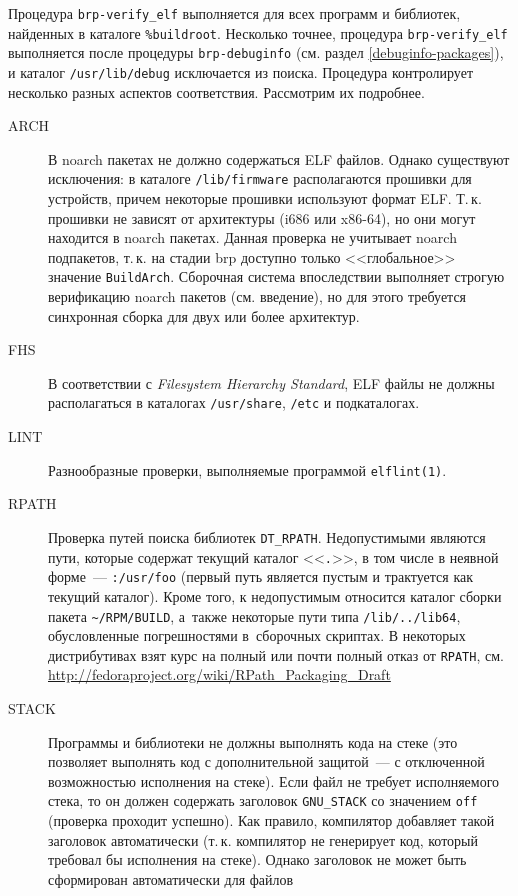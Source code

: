 \documentclass[russian,a4paper,12pt,titlepage]{article}
\begin{document}
Процедура \verb|brp-verify_elf| выполняется для всех программ и библиотек, найденных в каталоге \verb|%buildroot|.
Несколько точнее, процедура \verb|brp-verify_elf| выполняется после процедуры \verb|brp-debuginfo| (см. раздел
\ref{debuginfo-packages}), и каталог \verb|/usr/lib/debug| исключается из поиска.  Процедура контролирует несколько
разных аспектов соответствия.  Рассмотрим их подробнее.

\begin{description}
\item[ARCH] В noarch пакетах не должно содержаться ELF файлов.  Однако существуют исключения: в каталоге \verb|/lib/firmware|
располагаются прошивки для устройств, причем некоторые прошивки используют формат ELF.  Т.\,к. прошивки не зависят от архитектуры
(i686 или x86-64), но они могут находится в noarch пакетах.  Данная проверка не учитывает noarch подпакетов, т.\,к. на стадии
brp доступно только <<глобальное>> значение \verb|BuildArch|.  Сборочная система впоследствии выполняет строгую верификацию
noarch пакетов (см. введение), но для этого требуется синхронная сборка для двух или более архитектур.
\item[FHS] В соответствии с \textsl{Filesystem Hierarchy Standard}, ELF файлы не должны располагаться в каталогах \verb|/usr/share|,
\verb|/etc| и подкаталогах.
\item[LINT] Разнообразные проверки, выполняемые программой \verb|elflint(1)|.
\item[RPATH] Проверка путей поиска библиотек \verb|DT_RPATH|.  Недопустимыми являются пути, которые содержат текущий каталог <<\verb|.|>>,
в том числе в неявной форме~--- \verb|:/usr/foo| (первый путь является пустым и трактуется как текущий каталог).
Кроме того, к недопустимым относится каталог сборки пакета \verb|~/RPM/BUILD|, а~также некоторые пути типа \verb|/lib/../lib64|,
обусловленные погрешностями в~сборочных скриптах.  В некоторых дистрибутивах взят курс на полный или почти полный отказ от \verb|RPATH|,
см. \url{http://fedoraproject.org/wiki/RPath_Packaging_Draft}
\item[STACK] Программы и библиотеки не должны выполнять кода на стеке (это позволяет выполнять код с дополнительной защитой~---
с отключенной возможностью исполнения на стеке).  Если файл не требует исполняемого стека, то он должен содержать заголовок \verb|GNU_STACK|
со значением \verb|off| (проверка проходит успешно).  Как правило, компилятор добавляет такой заголовок автоматически (т.\,к. компилятор
не генерирует код, который требовал бы исполнения на стеке).  Однако заголовок не может быть сформирован автоматически для файлов

\end{description}
\end{document}
